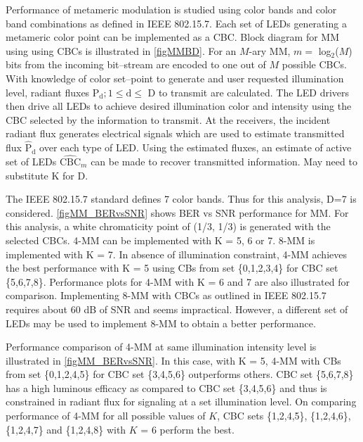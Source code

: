 Performance of metameric modulation is studied using color bands and color band combinations as defined in IEEE 802.15.7. Each set of LEDs generating a metameric color point can be implemented as a CBC. Block diagram for MM using using CBCs is illustrated in \figurename{ \ref{figMMBD}}. For an $M$-ary MM, $m=$ log$^{ }_{2}$($M$) bits from the incoming bit--stream are encoded to one out of $M$ possible CBCs. With knowledge of color set--point to generate and user requested illumination level, radiant fluxes P$_{\text{d}}; 1\leq\text{d}\leq$ D to transmit are calculated. The LED drivers then drive all LEDs to achieve desired illumination color and intensity using the CBC selected by the information to transmit. At the receivers, the incident radiant flux generates electrical signals which are used to estimate transmitted flux $\hat{\text{P}}_{\text{d}}$ over each type of LED. Using the estimated fluxes, an estimate of active set of LEDs $\hat{\text{CBC}}_{m}$ can be made to recover transmitted information. {\color{red}May need to substitute K for D.}

The IEEE 802.15.7 standard defines 7 color bands. Thus for this analysis, D=7 is considered. \figurename{ \ref{figMM_BERvsSNR}} shows BER vs SNR performance for MM. For this analysis, a white chromaticity point of (1/3, 1/3) is generated with the selected CBCs. 4-MM can be implemented with K = 5, 6 or 7. 8-MM is implemented with K = 7. In absence of illumination constraint, 4-MM achieves the best performance with K = 5 using CBs from set \{0,1,2,3,4\} for CBC set \{5,6,7,8\}. Performance plots for 4-MM with K = 6 and 7 are also illustrated for comparison. Implementing 8-MM with CBCs as outlined in IEEE 802.15.7 requires about 60 dB of SNR and seems impractical. However, a different set of LEDs may be used to implement 8-MM to obtain a better performance.

Performance comparison of 4-MM at same illumination intensity level is illustrated in \figurename{ \ref{figMM_BERvsSNR}}. In this case, with K = 5, 4-MM with CBs from set \{0,1,2,4,5\} for CBC set \{3,4,5,6\} outperforms others.  CBC set \{5,6,7,8\} has a high luminous efficacy as compared to  CBC set \{3,4,5,6\} and thus is constrained in radiant flux for signaling at a set illumination level. On comparing performance of 4-MM for all possible values of $K$, CBC sets \{1,2,4,5\}, \{1,2,4,6\}, \{1,2,4,7\} and \{1,2,4,8\} with $K$ = 6 perform the best.

